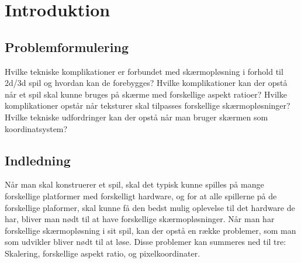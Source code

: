 \documentclass[Main.tex]{introduktion}
\begin{document}
\chapter{Introduktion}

			
\section{Problemformulering}
Hvilke tekniske komplikationer er forbundet med skærmopløsning i forhold til 2d/3d spil og hvordan kan de forebygges?
Hvilke komplikationer kan der opstå når et spil skal kunne bruges på skærme med forskellige aspekt ratioer?
Hvilke komplikationer opstår når teksturer skal tilpasses forskellige skærmopløsninger?
Hvilke tekniske udfordringer kan der opstå når man bruger skærmen som koordinatsystem?
		
\section{Indledning}

Når man skal konstruerer et spil, skal det typisk kunne spilles på mange forskellige platformer med forskelligt hardware, og for at alle spillerne på de forskellige plaformer, skal kunne få den bedst mulig oplevelse til det hardware de har, bliver man nødt til at have forskellige skærmopløsninger. 
Når man har forskellige skærmopløsning i sit spil, kan der opstå en række problemer, som man som udvikler bliver nødt til at løse. Disse problemer kan summeres ned til tre: Skalering, forskellige aspekt ratio, og pixelkoordinater.		
	
\end{document}
